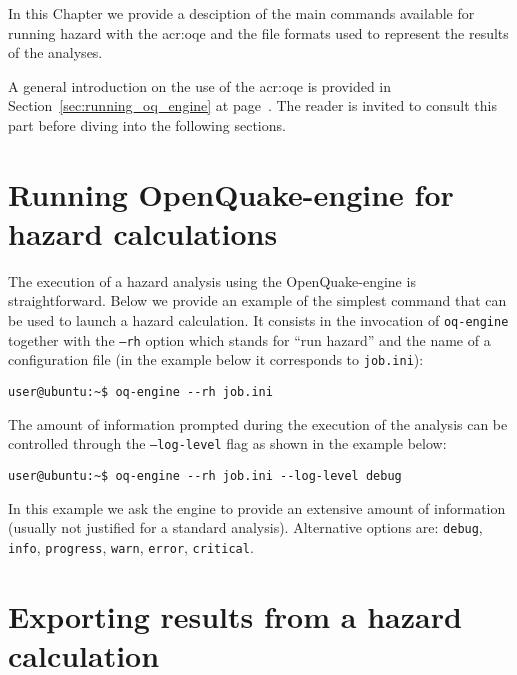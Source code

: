 In this Chapter we provide a desciption of the main commands available for
running hazard with the \gls{acr:oqe} and the file formats used to represent
the results of the analyses.

A general introduction on the use of the \glsdesc{acr:oqe} is provided in
Section~\ref{sec:running_oq_engine} at page~\pageref{sec:running_oq_engine}. The
reader is invited to consult this part before diving into the following
sections.


\section{Running OpenQuake-engine for hazard calculations}
\label{sec:running_hazard_calculations}

The execution of a hazard analysis using the OpenQuake-engine is
straightforward. Below we provide an example of the simplest command that can be
used to launch a hazard calculation. It consists in the invocation of \texttt
{oq-engine} together with the \texttt{--rh} option which stands for ``run
hazard'' and the name of a configuration file (in the example below it
corresponds to \texttt{job.ini}):

\begin{Verbatim}[frame=single, commandchars=\\\{\}, fontsize=\small]
user@ubuntu:~$ oq-engine --rh job.ini
\end{Verbatim}

The amount of information prompted during the execution of the analysis can be
controlled through the \texttt{--log-level} flag as shown in the example below:

\begin{Verbatim}[frame=single, commandchars=\\\{\}, fontsize=\small]
user@ubuntu:~$ oq-engine --rh job.ini --log-level debug
\end{Verbatim}

In this example we ask the engine to provide an extensive amount of information
(usually not justified for a standard analysis). Alternative options are:
\texttt{debug}, \texttt{info}, \texttt{progress}, \texttt{warn}, \texttt{error},
\texttt{critical}.


\section{Exporting results from a hazard calculation}
\label{sec:exporting_hazard_results}

